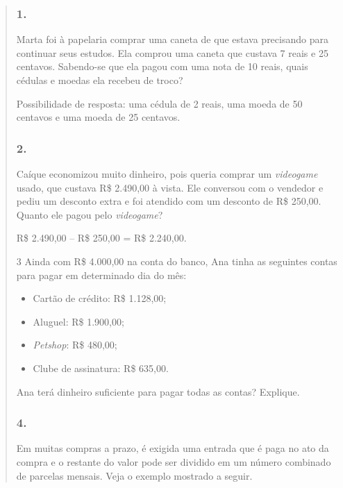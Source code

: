 \begin{enumerate}
\begin{escolha}
\begin{enumerate}
\begin{itemize}
\begin{itemize}
\begin{escolha}
\begin{quote}
\subsubsection{1.}\label{section-65}

Marta foi à papelaria comprar uma caneta de que estava precisando para
continuar seus estudos. Ela comprou uma caneta que custava 7 reais e 25
centavos. Sabendo-se que ela pagou com uma nota de 10 reais, quais
cédulas e moedas ela recebeu de troco?

Possibilidade de resposta: uma cédula de 2 reais, uma moeda de 50 centavos e uma moeda de 25 centavos.

\subsubsection{2.}\label{section-66}

Caíque economizou muito dinheiro, pois queria comprar um \textit{videogame} usado,
que custava R\$ 2.490,00 à vista. Ele conversou com o vendedor e pediu
um desconto extra e foi atendido com um desconto de R\$ 250,00. Quanto
ele pagou pelo \textit{videogame}?

R\$ 2.490,00 -- R\$ 250,00 = R\$ 2.240,00.

\num{3} Ainda com R\$ 4.000,00 na conta do banco, Ana tinha as seguintes contas para pagar em determinado dia do mês:

\begin{itemize}
  \item Cartão de crédito: R\$ 1.128,00;
  \item Aluguel: R\$ 1.900,00;
  \item \textit{Petshop}: R\$ 480,00;
  \item Clube de assinatura: R\$ 635,00.
\end{itemize}

Ana terá dinheiro suficiente para pagar todas as contas? Explique.



\subsubsection{4.}\label{section-68}

Em muitas compras a prazo, é exigida uma entrada que é paga no ato da
compra e o restante do valor pode ser dividido em um número combinado de
parcelas mensais. Veja o exemplo mostrado a seguir.


\end{quote}
\end{escolha}
\end{itemize}
\end{itemize}
\end{enumerate}
\end{escolha}
\end{enumerate}
